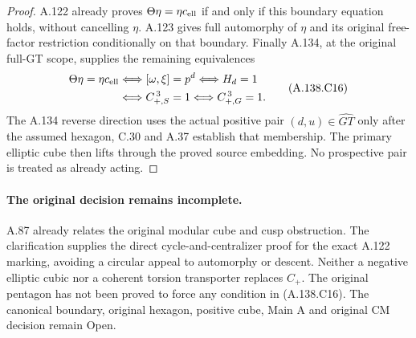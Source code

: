 \begin{proof}
A.122 already proves
\(\Theta\eta=\eta c_{\rm ell}\) if and only if this
boundary equation holds, without cancelling \(\eta\).
A.123 gives full automorphy of \(\eta\) and its original
free-factor restriction conditionally on that boundary.
Finally A.134, at the original full-GT scope, supplies
the remaining equivalences
\[
\begin{aligned}
 \Theta\eta=\eta c_{\rm ell}
 &\Longleftrightarrow [\omega,\xi]=p^d
 \Longleftrightarrow H_d=1\\
 &\Longleftrightarrow C_{+,S}^{\,3}=1
 \Longleftrightarrow C_{+,G}^{\,3}=1 .
\end{aligned}
\tag{A.138.C16}
\]
The A.134 reverse direction uses the actual positive pair
\((d,u)\in\widehat{GT}\) only after the assumed hexagon,
C.30 and A.37 establish that membership. The primary
elliptic cube then lifts through the proved source embedding.
No prospective pair is treated as already acting.
\end{proof}

\paragraph{The original decision remains incomplete.}
A.87 already relates the original modular cube and cusp
obstruction. The clarification supplies the direct
cycle-and-centralizer proof for the exact A.122 marking,
avoiding a circular appeal to automorphy or descent.
Neither a negative elliptic cubic nor a coherent torsion
transporter replaces \(C_+\). The original pentagon has
not been proved to force any condition in (A.138.C16).
The canonical boundary, original hexagon, positive cube,
Main A and original CM decision remain Open.
